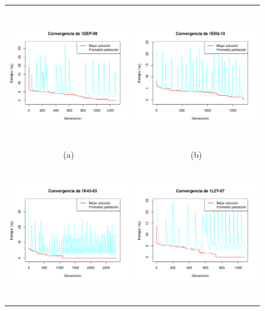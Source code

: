 \begin{figure}
\centering
\begin{tabular}{c c}
\\
\includegraphics[height=6cm]{images/convergencia-1DEP-09.png} & \includegraphics[height=6cm]{images/convergencia-1E0Q-10.png} \\
(a) & (b) \\
\includegraphics[height=6cm]{images/convergencia-1K43-03.png} & \includegraphics[height=6cm]{images/convergencia-1L2Y-07.png} \\

\end{tabular}
\end{figure}
